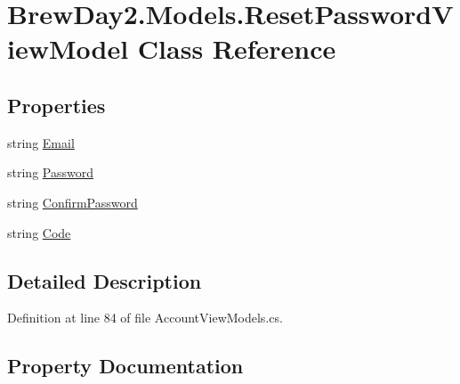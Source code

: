 \hypertarget{class_brew_day2_1_1_models_1_1_reset_password_view_model}{}\section{Brew\+Day2.\+Models.\+Reset\+Password\+View\+Model Class Reference}
\label{class_brew_day2_1_1_models_1_1_reset_password_view_model}
\subsection*{Properties}
\begin{DoxyCompactItemize}
\item 
string \mbox{\hyperlink{class_brew_day2_1_1_models_1_1_reset_password_view_model_a8cc3da37245e24a2ea2ce1abcdd3510b}{Email}}
\item 
string \mbox{\hyperlink{class_brew_day2_1_1_models_1_1_reset_password_view_model_a6320cc02c8c3f7ee2aba95eb514187a9}{Password}}
\item 
string \mbox{\hyperlink{class_brew_day2_1_1_models_1_1_reset_password_view_model_aee679b2f83f26cc201960065976bbbcc}{Confirm\+Password}}
\item 
string \mbox{\hyperlink{class_brew_day2_1_1_models_1_1_reset_password_view_model_a5545ffa065af4a414ab58a7f7055cf97}{Code}}
\end{DoxyCompactItemize}


\subsection{Detailed Description}


Definition at line 84 of file Account\+View\+Models.\+cs.



\subsection{Property Documentation}
\mbox{\label{class_brew_day2_1_1_models_1_1_reset_password_view_model_a5545ffa065af4a414ab58a7f7055cf97}} 
